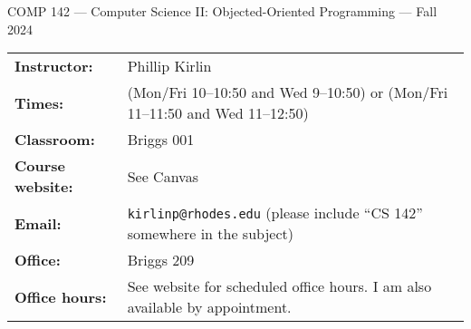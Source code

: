 \documentclass [letterpaper,11pt]{article}
\begin{document}
\begin{center}
\large COMP 142 --- Computer Science II: Objected-Oriented Programming --- Fall 2024

\end{center}

\noindent\begin{tabular}{@{}ll}
\textbf{Instructor:} & Phillip Kirlin \\
\textbf{Times:} & (Mon/Fri 10--10:50 and Wed 9--10:50) or (Mon/Fri 11--11:50 and Wed 11--12:50) \\
\textbf{Classroom:} & Briggs 001 \\
\textbf{Course website:} & See Canvas\\
\textbf{Email:} &\texttt{kirlinp@rhodes.edu} (please include ``CS 142'' somewhere in the subject)\\
\textbf{Office:} & Briggs 209\\
\textbf{Office hours:} & See website for scheduled office hours.  I am also available by appointment.\\
\end{tabular}
\end{document}
